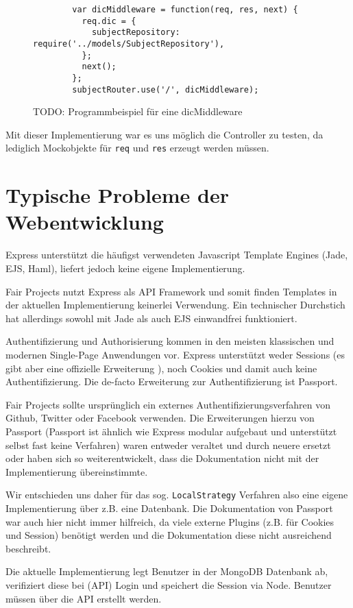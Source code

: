 \begin{figure}[t]
	\centering
	\begin{lstlisting}
		var dicMiddleware = function(req, res, next) {
		  req.dic = {
		    subjectRepository: require('../models/SubjectRepository'),
		  };
		  next();
		};
		subjectRouter.use('/', dicMiddleware);
	\end{lstlisting}
	\caption[dicMiddleware]{TODO: Programmbeispiel für eine dicMiddleware}
	\label{f:dicMiddleware}
\end{figure}

Mit dieser Implementierung war es uns möglich die Controller zu testen,
da lediglich Mockobjekte für \texttt{req} und \texttt{res} erzeugt
werden müssen.

\section{Typische Probleme der
Webentwicklung}\label{typische-probleme-der-webentwicklung}

Express unterstützt die häufigst verwendeten Javascript Template Engines
(Jade\cite{jade}, EJS\cite{ejs}, Haml\cite{haml}), liefert jedoch
keine eigene Implementierung.

Fair Projects nutzt Express als API Framework und somit finden Templates in der
aktuellen Implementierung keinerlei Verwendung. Ein technischer
Durchstich hat allerdings sowohl mit Jade als auch EJS einwandfrei funktioniert.

Authentifizierung und Authorisierung kommen in den meisten klassischen
und modernen Single-Page Anwendungen vor. Express unterstützt weder
Sessions (es gibt aber eine offizielle Erweiterung \cite{express-session}), noch
Cookies und damit auch keine Authentifizierung. Die de-facto Erweiterung
zur Authentifizierung ist Passport\cite{passport}.

Fair Projects sollte ursprünglich ein externes
Authentifizierungsverfahren von Github, Twitter oder Facebook verwenden.
Die Erweiterungen hierzu von Passport (Passport ist ähnlich wie Express
modular aufgebaut und unterstützt selbst fast keine Verfahren) waren
entweder veraltet und durch neuere ersetzt oder haben sich so
weiterentwickelt, dass die Dokumentation nicht mit der Implementierung
übereinstimmte.

Wir entschieden uns daher für das sog. \texttt{LocalStrategy} Verfahren
also eine eigene Implementierung über z.B. eine Datenbank. Die
Dokumentation von Passport war auch hier nicht immer hilfreich, da viele
externe Plugins (z.B. für Cookies und Session) benötigt werden und die
Dokumentation diese nicht ausreichend beschreibt.

Die aktuelle Implementierung legt Benutzer in der MongoDB Datenbank ab,
verifiziert diese bei (API) Login und speichert die Session via Node.
Benutzer müssen über die API erstellt werden.